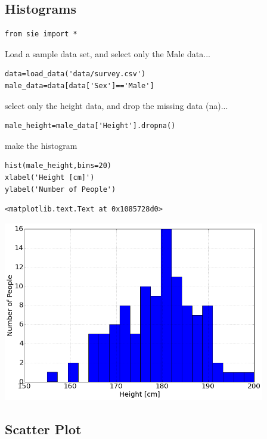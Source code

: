 \subsection{Histograms}


\begin{lstlisting}
from sie import *
\end{lstlisting}

Load a sample data set, and select only the Male data...

\begin{lstlisting}
data=load_data('data/survey.csv')
male_data=data[data['Sex']=='Male']
\end{lstlisting}

select only the height data, and drop the missing data (na)...

\begin{lstlisting}
male_height=male_data['Height'].dropna()
\end{lstlisting}

make the histogram

\begin{lstlisting}
hist(male_height,bins=20)
xlabel('Height [cm]')
ylabel('Number of People')
\end{lstlisting}

\begin{verbatim}
<matplotlib.text.Text at 0x1085728d0>
\end{verbatim}

\begin{center}\includegraphics[width=4.5in]{Random_Sequences_and_Visualization/Random_Sequences_and_Visualization_fig0.png}\end{center}

\subsection{Scatter Plot}


